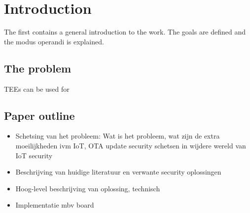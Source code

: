 \chapter{Introduction}
\label{cha:intro}
The first contains a general introduction to the work. The goals are
defined and the modus operandi is explained.

\section{The problem}
TEEs can be used for 

\section{Paper outline}
\begin{itemize}
    \item Schetsing van het probleem: Wat is het probleem, wat zijn de extra moeilijkheden ivm IoT, OTA update security schetsen in wijdere wereld van IoT security
    \item Beschrijving van huidige literatuur en verwante security oplossingen
    \item Hoog-level beschrijving van oplossing, technisch 
    \item Implementatie mbv board 
\end{itemize}

